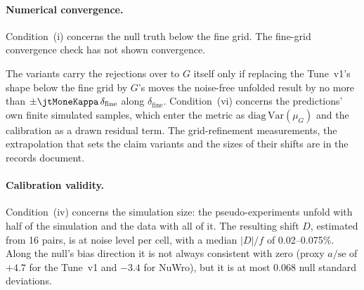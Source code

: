 
\paragraph{Numerical convergence.} Condition~(i) concerns the null truth below the fine grid. The fine-grid convergence check has not shown convergence.



The variants carry the rejections over to $G$ itself only if replacing the Tune~v1's shape below the fine grid by $G$'s moves the noise-free unfolded result by no more than $\pm\jtMoneKappa\,\delta_{\mathrm{fine}}$ along $\delta_{\mathrm{fine}}$. Condition~(vi) concerns the predictions' own finite simulated samples, which enter the metric as $\mathrm{diag}\,\mathrm{Var}(\mu_{G})$ and the calibration as a drawn residual term. The grid-refinement measurements, the extrapolation that sets the claim variants and the sizes of their shifts are in the records document.

\paragraph{Calibration validity.} Condition~(iv) concerns the simulation size: the pseudo-experiments unfold with half of the simulation and the data with all of it. The resulting shift $D$, estimated from 16 pairs, is at noise level per cell, with a median $|D|/f$ of 0.02--0.075\%. Along the null's bias direction it is not always consistent with zero (proxy $a/\mathrm{se}$ of $+4.7$ for the Tune~v1 and $-3.4$ for NuWro), but it is at most 0.068 null standard deviations.



